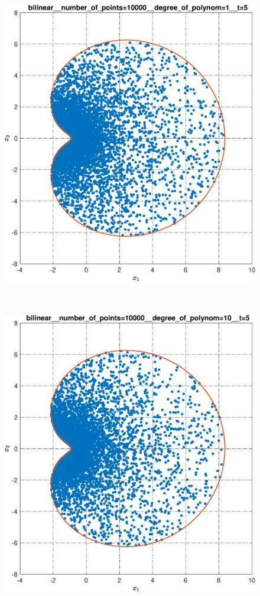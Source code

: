 \documentclass[../main.tex]{subfiles}
\begin{document}
\begin{figure}[ht!]
\begin{minipage}[b]{.3\linewidth}
 		\includegraphics[width=\linewidth]{images/bilinear__number_of_points=10000__degree_of_polynom=1__t=5.eps}
 	\end{minipage}
 	\hfill
 	\begin{minipage}[b]{.3\linewidth} 
 		\small
 		\centering
 		\includegraphics[width=\linewidth]{images/bilinear__number_of_points=10000__degree_of_polynom=10__t=5.eps}

\end{minipage}
\end{figure}
\end{document}
